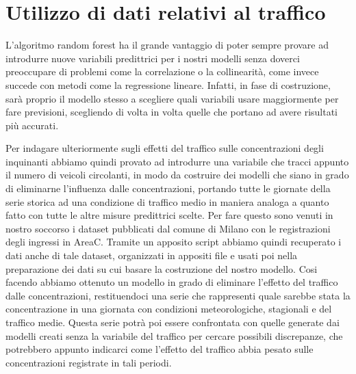 \documentclass[a4paper,12pt]{report}
\begin{document}
\section{Utilizzo di dati relativi al traffico}
L'algoritmo random forest ha il grande vantaggio di poter sempre provare ad introdurre nuove variabili predittrici per i nostri modelli senza doverci preoccupare di problemi come la correlazione o la collinearità, come invece succede con metodi come la regressione lineare. Infatti, in fase di costruzione, sarà proprio il modello stesso a scegliere quali variabili usare maggiormente per fare previsioni, scegliendo di volta in volta quelle che portano ad avere risultati più accurati.

Per indagare ulteriormente sugli effetti del traffico sulle concentrazioni degli inquinanti abbiamo quindi provato ad introdurre una variabile che tracci appunto il numero di veicoli circolanti, in modo da costruire dei modelli che siano in grado di eliminarne l'influenza dalle concentrazioni, portando tutte le giornate della serie storica ad una condizione di traffico medio in maniera analoga a quanto fatto con tutte le altre misure predittrici scelte.
Per fare questo sono venuti in nostro soccorso i dataset \cite{areac2012, areac2013, areac2014, areac2015, areac2016, areac2017, areac2018, areac20192020}
 pubblicati dal comune di Milano con le registrazioni degli ingressi in AreaC. Tramite un apposito script
 abbiamo quindi recuperato i dati anche di tale dataset, organizzati in appositi file e usati poi nella preparazione dei dati su cui basare la costruzione del nostro modello. Cosi facendo abbiamo ottenuto un modello in grado di eliminare l'effetto del traffico dalle concentrazioni, restituendoci una serie che rappresenti quale sarebbe stata la concentrazione in una giornata con condizioni meteorologiche, stagionali e del traffico medie. Questa serie potrà poi essere confrontata con quelle generate dai modelli creati senza la variabile del traffico per cercare possibili discrepanze, che potrebbero appunto indicarci come l'effetto del traffico abbia pesato sulle concentrazioni registrate in tali periodi.
\end{document}
